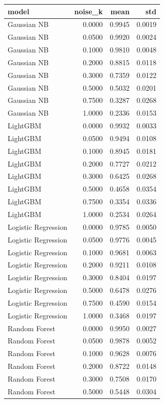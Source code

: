 \begin{tabular}{lrrr}
\toprule
model & noise_k & mean & std \\
\midrule
Gaussian NB & 0.0000 & 0.9945 & 0.0019 \\
Gaussian NB & 0.0500 & 0.9920 & 0.0024 \\
Gaussian NB & 0.1000 & 0.9810 & 0.0048 \\
Gaussian NB & 0.2000 & 0.8815 & 0.0118 \\
Gaussian NB & 0.3000 & 0.7359 & 0.0122 \\
Gaussian NB & 0.5000 & 0.5032 & 0.0201 \\
Gaussian NB & 0.7500 & 0.3287 & 0.0268 \\
Gaussian NB & 1.0000 & 0.2336 & 0.0153 \\
LightGBM & 0.0000 & 0.9932 & 0.0033 \\
LightGBM & 0.0500 & 0.9494 & 0.0108 \\
LightGBM & 0.1000 & 0.8945 & 0.0181 \\
LightGBM & 0.2000 & 0.7727 & 0.0212 \\
LightGBM & 0.3000 & 0.6425 & 0.0268 \\
LightGBM & 0.5000 & 0.4658 & 0.0354 \\
LightGBM & 0.7500 & 0.3354 & 0.0336 \\
LightGBM & 1.0000 & 0.2534 & 0.0264 \\
Logistic Regression & 0.0000 & 0.9785 & 0.0050 \\
Logistic Regression & 0.0500 & 0.9776 & 0.0045 \\
Logistic Regression & 0.1000 & 0.9681 & 0.0063 \\
Logistic Regression & 0.2000 & 0.9211 & 0.0108 \\
Logistic Regression & 0.3000 & 0.8404 & 0.0197 \\
Logistic Regression & 0.5000 & 0.6478 & 0.0276 \\
Logistic Regression & 0.7500 & 0.4590 & 0.0154 \\
Logistic Regression & 1.0000 & 0.3468 & 0.0197 \\
Random Forest & 0.0000 & 0.9950 & 0.0027 \\
Random Forest & 0.0500 & 0.9878 & 0.0052 \\
Random Forest & 0.1000 & 0.9628 & 0.0076 \\
Random Forest & 0.2000 & 0.8722 & 0.0148 \\
Random Forest & 0.3000 & 0.7508 & 0.0170 \\
Random Forest & 0.5000 & 0.5448 & 0.0304 \\

\end{tabular}
